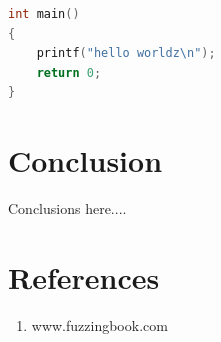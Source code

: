 \documentclass[12pt]{Training}
\begin{document}
\begin{sectionbox}
\begin{lstlisting}[language=C, caption={Code Example Listing}]
int main()
{
    printf("hello worldz\n");
    return 0;
}
\end{lstlisting}
\end{sectionbox}


\section*{Conclusion}
Conclusions here....

\section*{References}
\begin{enumerate}
	\item www.fuzzingbook.com
\end{enumerate}
\end{document}
